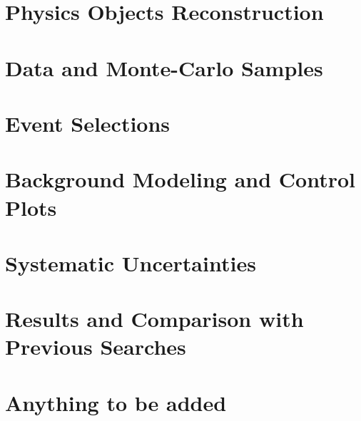 \documentclass[11pt,a4paper,oldfontcommands]{memoir}
\begin{document}
\chapter{Physics Objects Reconstruction}

\chapter{Data and Monte-Carlo Samples}

\chapter{Event Selections}

\chapter{Background Modeling and Control Plots}

\chapter{Systematic Uncertainties}

\chapter{Results and Comparison with Previous Searches}


\appendix

\chapter{Anything to be added}



\end{document}
